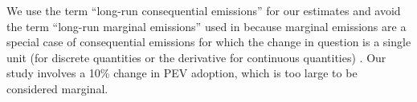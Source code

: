 \documentclass[9pt,twocolumn,twoside,lineno]{pnas-new}
\begin{document}
We use the term ``long-run consequential emissions'' for our estimates and avoid the term ``long-run marginal emissions'' used in \cite{gagnon_short-run_2022} because marginal emissions are a special case of consequential emissions for which the change in question is a single unit (for discrete quantities or the derivative for continuous quantities) \cite{committee_on_current_methods_for_life_cycle_analyses_of_low-carbon_transportation_fuels_in_the_united_states_current_2022}. Our study involves a 10\% change in PEV adoption, which is too large to be considered marginal.


 
\end{document}
